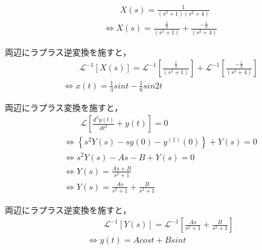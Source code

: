 \documentclass[a4paper,12pt]{article}
\begin{document}
\begin{tcolorbox}[title={ [16] (10) \( X(s)=\frac{ 1 }{ ( s^2 + 1 ) ( s^2 + 4 ) } \) }]
  \vspace{-3mm}
  \begin{align*}
    &\qquad X(s) =\frac{ 1 }{ ( s^2 + 1 ) ( s^2 + 4 ) } \\
    &\Leftrightarrow X(s) 
    = \frac{ \frac{1}{3} }{ ( s^2 + 1 ) }
    + \frac{ -\frac{1}{3} }{ ( s^2 + 4 ) }
\end{align*}

\quad 両辺にラプラス逆変換を施すと，
\vspace{-3mm}
\begin{align*}
    &\qquad \mathcal{L}^{-1} \left[ X(s) \right] 
    =\mathcal{L}^{-1} \left[ \frac{ \frac{1}{3} }{ ( s^2 + 1 ) } \right]
    +\mathcal{L}^{-1} \left[ \frac{- \frac{1}{3} }{ ( s^2 + 4 ) } \right] \\
    &\Leftrightarrow x(t) = \frac{1}{3}sin t -\frac{1}{6}sin 2t
\end{align*}

\end{tcolorbox}
\begin{tcolorbox}[title={[17] つぎの微分方程式をラプラス変換を用いて解け．\\
  \[
  \frac{d^2y(t)}{dt^2} + y(t) = 0
  \]
  
  \quad ただし，初期条件は，\(y(0)=A, y^{(1)}(0)=B\) とする． }]

  \quad 両辺にラプラス変換を施すと，
\vspace{-3mm}
\begin{align*}
    &\qquad \mathcal{L}\left[ \frac{d^2y(t)}{dt^2} + y(t) \right] = 0 \\
    &\Leftrightarrow \left\{ s^2 Y(s) - sy(0) - y^{(1)}(0) \right\} + Y(s) = 0  \\
    &\Leftrightarrow s^2 Y(s) - A s - B + Y(s) = 0  \\
    &\Leftrightarrow Y(s) = \frac{As + B}{ s^2 + 1}  \\
    &\Leftrightarrow Y(s) = \frac{As}{ s^2 + 1} + \frac{B}{ s^2 + 1} 
\end{align*}
    
\quad 両辺にラプラス逆変換を施すと，
\vspace{-3mm}
\begin{align*}
&\qquad \mathcal{L}^{-1} \left[ Y(s) \right] 
= \mathcal{L}^{-1} \left[ \frac{As}{ s^2 + 1} + \frac{B}{ s^2 + 1}  \right] \\
&\Leftrightarrow y(t) = A cos{t} + B sin{t}
\end{align*}
  \end{tcolorbox}
\end{document}
